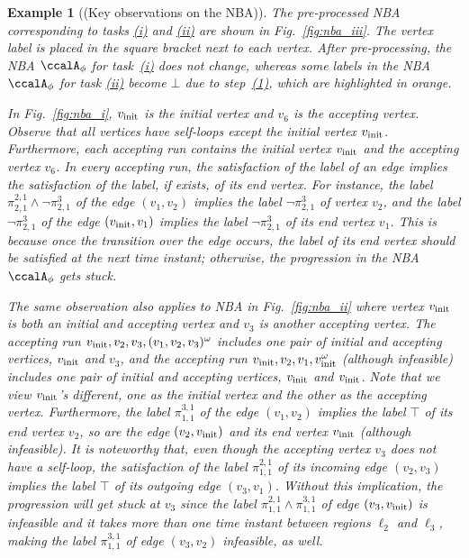 \documentclass[Afour,sageh,times]{sagej}
\newtheorem{exmp}{Example}
\newcommand{\autop}{\ccalA_{\phi}}
\newcommand{\vertex}[1]{v_{\textup{#1}}}
\renewcommand{\ap}[3]{\mathcal{\pi}_{{#1},{#2}}^{#3}}
\newenvironment{cexmp}
{\addtocounter{exmp}{-1}\begin{exmp}}
  {\end{exmp}}
\begin{document}
 \begin{cexmp}[(Key observations on the NBA)]
   The pre-processed NBA corresponding to tasks \hyperref[task:i]{\it (i)} and \hyperref[task:i]{\it (ii)} are shown in Fig.~\ref{fig:nba_iii}. The vertex label is placed in the square bracket next to each vertex. After pre-processing, the NBA $\autop$ for task~\hyperref[task:i]{\it (i)} does not change, whereas some labels in the NBA $\autop$ for task \hyperref[task:i]{\it (ii)} become $\bot$ due to step~\hyperref[prune:exclusion1]{\it (1)}, which are highlighted in orange.

   In Fig.~\ref{fig:nba_i}, $\vertex{init}$ is the initial vertex and $v_6$ is the accepting vertex. Observe that all vertices have self-loops except the initial vertex $\vertex{init}$. Furthermore, each accepting run contains the initial vertex $\vertex{init}$ and the accepting vertex $v_6$. In every accepting run, the satisfaction of the label of an edge implies the satisfaction of the label, if exists, of its end vertex. For instance, the label $\ap{2}{1}{2,1} \wedge \neg\ap{2}{1}{3}$ of the edge $(v_1, v_2)$ implies the label $\neg\ap{2}{1}{3}$ of vertex $v_2$, and  the label $\neg\ap{2}{1}{3}$ of the edge  $(\vertex{init}, v_1)$ implies the label $\neg\ap{2}{1}{3}$ of  its end vertex $v_1$. This is because once the transition over the edge occurs, the label of its end vertex should be satisfied at the next time instant; otherwise, the progression in the NBA $\autop$ gets stuck.

   The same observation also applies to NBA in Fig.~\ref{fig:nba_ii} where vertex $\vertex{init}$ is both an initial and accepting vertex and $v_3$ is another accepting vertex.  The accepting run $\vertex{init}, v_2, v_3, (v_1, v_2, v_3)^\omega$ includes one pair of initial and accepting vertices, $\vertex{init}$ and  $v_3$, and the accepting run $\vertex{init}, v_2, v_1, \vertex{init}^\omega$ (although infeasible) includes one pair of initial and accepting vertices, $\vertex{init}$ and $\vertex{init}$. Note that we view $\vertex{init}$'s different, one as the initial vertex and the other as the accepting vertex. Furthermore, the label $\ap{1}{1}{3,1}$ of the edge $(v_1, v_2)$  implies the label $\top$ of its end vertex $v_2$, so are the edge $(v_2, \vertex{init})$ and its end vertex $\vertex{init}$ (although infeasible). It is noteworthy that, even though the accepting vertex $v_3$ does not have a self-loop, the satisfaction of the label $\ap{1}{1}{2,1}$ of its incoming edge $(v_2, v_3)$ implies the label $\top$ of its outgoing edge $(v_3, v_1)$. Without this implication, the progression will get stuck at $v_3$ since the label $\ap{1}{1}{2,1} \wedge \ap{1}{1}{3,1}$ of edge $(v_3, \vertex{init})$ is infeasible and it takes more than one time instant between regions $\ell_2$ and $\ell_3$, making the label $\ap{1}{1}{3,1}$ of edge $(v_3, v_2)$ infeasible, as well.
 \end{cexmp}
\end{document}
